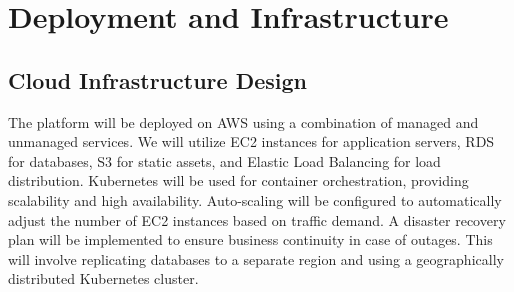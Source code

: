 \documentclass[11pt,a4paper,oneside]{article}
\begin{document}
\section{Deployment and Infrastructure}

\subsection{Cloud Infrastructure Design}

The platform will be deployed on AWS using a combination of managed and unmanaged services.  We will utilize EC2 instances for application servers, RDS for databases, S3 for static assets, and Elastic Load Balancing for load distribution.  Kubernetes will be used for container orchestration, providing scalability and high availability.  Auto-scaling will be configured to automatically adjust the number of EC2 instances based on traffic demand.  A disaster recovery plan will be implemented to ensure business continuity in case of outages.  This will involve replicating databases to a separate region and using a geographically distributed Kubernetes cluster.
\end{document}
